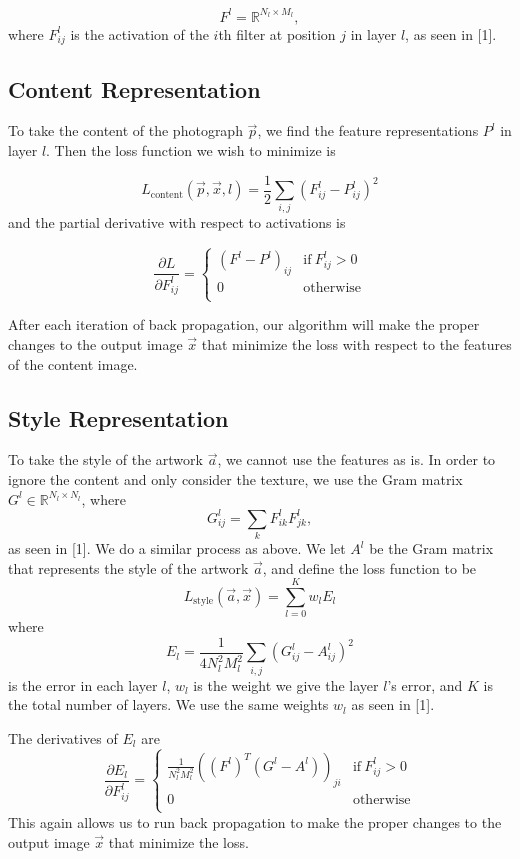 \documentclass[10pt,twocolumn,letterpaper]{article}
\begin{document}
\[ F^l = \mathbb{R}^{N_l \times M_l} , \]
where $F_{ij}^l$ is the activation of the $i$th filter at position $j$ in layer $l$, as seen in [1].
\newline

\subsection{Content Representation}

To take the content of the photograph $\vec{p}$, we find the feature representations $P^l$ in layer $l$. Then the loss function we wish to minimize is

 \[ L_{\text{content}} ( \vec{p}, \vec{x}, l ) = \frac{1}{2} \sum_{i,j} (F_{ij}^l - P_{ij}^l)^2 \]
and the partial derivative with respect to activations is

\[ \frac{ \partial L}{\partial F_{ij}^l} = \left\{
    \begin{array}{ll}
          (F^l - P^l)_{ij} &\text{if} \ F_{ij}^l > 0 \\
         0 & \text{otherwise} \\
    \end{array} 
\right. \]

After each iteration of back propagation, our algorithm will make the proper changes to the output image $\vec{x}$ that minimize the loss with respect to the features of the content image.

\subsection{Style Representation}

To take the style of the artwork $\vec{a}$, we cannot use the features as is. In order to ignore the content and only consider the texture, we use the Gram matrix $G^l \in \mathbb{R}^{N_l \times N_l}$, where
\[ G_{ij}^l = \sum_k F_{ik}^l F_{jk}^l , \]
as seen in [1]. We do a similar process as above. We let $A^l$ be the Gram matrix that represents the style of the artwork $\vec{a}$, and define the loss function to be
\[ L_{\text{style}}(\vec{a}, \vec{x}) = \sum_{l = 0}^{K} w_l E_l \]
where
\[ E_l = \frac{1}{4N_l^2 M_l^2} \sum_{i,j} (G_{ij}^l - A_{ij}^l)^2 \]
is the error in each layer $l$, $w_l$ is the weight we give the layer $l$'s error, and $K$ is the total number of layers. We use the same weights $w_l$ as seen in [1].

The derivatives of $E_l$ are
\[ \frac{ \partial E_l}{\partial F_{ij}^l} = \left\{
    \begin{array}{ll}
         \frac{1}{N_l^2 M_l^2} ((F^l)^T (G^l - A^l))_{ji} &\text{if} \ F_{ij}^l > 0 \\
         0 & \text{otherwise} \\
    \end{array} 
\right. \]
This again allows us to run back propagation to make the proper changes to the output image $\vec{x}$ that minimize the loss.
\end{document}
